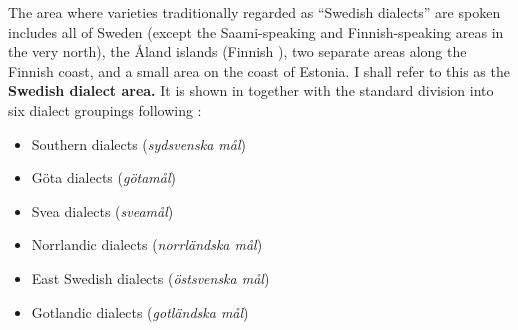 The area where varieties traditionally regarded as “Swedish dialects” are spoken includes all of Sweden (except the Saami-speaking and Finnish-speaking areas in the very north), the Åland islands (Finnish ), two separate areas along the Finnish coast, and a small area on the coast of Estonia. I shall refer to this as the \textbf{Swedish dialect area.} It is shown in together with the standard division into six dialect groupings following \citet[II:170]{Wessén1966}: 

\begin{itemize}
\item 

Southern dialects (\textit{sydsvenska mål})


\item 

Göta dialects (\textit{götamål})


\item 

Svea dialects (\textit{sveamål})


\item 

Norrlandic dialects (\textit{norrländska mål})


\item 

East Swedish dialects (\textit{östsvenska mål})


\item 

Gotlandic dialects (\textit{gotländska mål})


\end{itemize}

